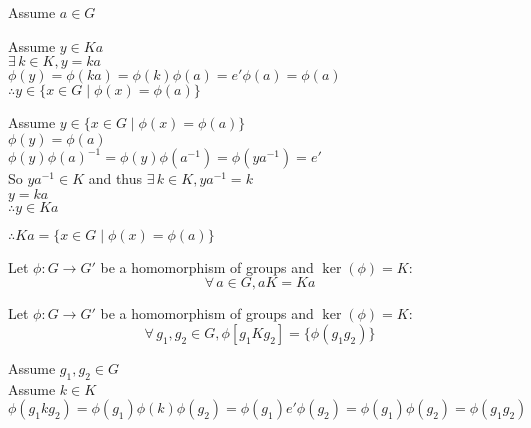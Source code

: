 \documentclass[letterpaper,12pt,fleqn]{article}
\newcommand{\p}{\phi}
\begin{document}
\begin{theproof}
  Assume $a\in G$
  
  Assume $y\in Ka$ \\
  $\exists\,k\in K,y=ka$ \\
  $\p(y)=\p(ka)=\p(k)\p(a)=e'\p(a)=\p(a)$ \\
  $\therefore y\in\{x\in G\mid\p(x)=\p(a)\}$

  Assume $y\in\{x\in G\mid\p(x)=\p(a)\}$ \\
  $\p(y)=\p(a)$ \\
  $\p(y)\p(a)^{-1}=\p(y)\p(a^{-1})=\p(ya^{-1})=e'$ \\
  So $ya^{-1}\in K$ and thus $\exists\,k\in K,ya^{-1}=k$ \\
  $y=ka$ \\
  $\therefore y\in Ka$

  $\therefore Ka=\{x\in G\mid\p(x)=\p(a)\}$
\end{theproof}

\begin{corollary}
  Let $\p:G\to G'$ be a homomorphism of groups and $\ker(\p)=K$:
  \[\forall\,a\in G,aK=Ka\]
\end{corollary}

\begin{theorem}
  Let $\p:G\to G'$ be a homomorphism of groups and $\ker(\p)=K$:
  \[\forall\,g_1,g_2\in G,\phi[g_1Kg_2]=\{\phi(g_1g_2)\}\]
\end{theorem}

\begin{theproof}
  Assume $g_1,g_2\in G$ \\
  Assume $k\in K$ \\
  $\p(g_1kg_2)=\p(g_1)\p(k)\p(g_2)=\p(g_1)e'\p(g_2)=\p(g_1)\p(g_2)=\p(g_1g_2)$
\end{theproof}
\end{document}
